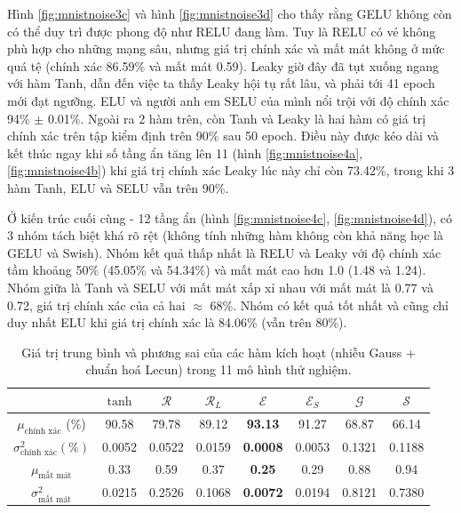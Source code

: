 Hình \ref{fig:mnistnoise3c} và hình \ref{fig:mnistnoise3d} cho thấy rằng GELU không còn có thể duy trì được phong độ như RELU đang làm.
Tuy là RELU có vẻ không phù hợp cho những mạng sâu, nhưng giá trị chính xác và mất mát không ở mức quá tệ (chính xác 86.59\% và mất mát 0.59).
Leaky giờ đây đã tụt xuống ngang với hàm Tanh, dẫn đến việc ta thấy Leaky hội tụ rất lâu, và phải tới 41 epoch mới đạt ngưỡng.
ELU và người anh em SELU của mình nổi trội với độ chính xác 94\% $\pm$ 0.01\%.
Ngoài ra 2 hàm trên, còn Tanh và Leaky là hai hàm có giá trị chính xác trên tập kiểm định trên 90\% sau 50 epoch.
Điều này được kéo dài và kết thúc ngay khi số tầng ẩn tăng lên 11 (hình \ref{fig:mnistnoise4a}, \ref{fig:mnistnoise4b}) khi giá trị chính xác Leaky lúc này chỉ còn 73.42\%, trong khi 3 hàm Tanh, ELU và SELU vẫn trên 90\%.
\vspace{5pt}

Ở kiến trúc cuối cùng - 12 tầng ẩn (hình \ref{fig:mnistnoise4c}, \ref{fig:mnistnoise4d}), có 3 nhóm tách biệt khá rõ rệt (không tính những hàm không còn khả năng học là GELU và Swish).
Nhóm kết quả thấp nhất là RELU và Leaky với độ chính xác tầm khoảng 50\% (45.05\% và 54.34\%) và mất mát cao hơn 1.0 (1.48 và 1.24).
Nhóm giữa là Tanh và SELU với mất mát xấp xỉ nhau với mất mát là 0.77 và 0.72, giá trị chính xác của cả hai $\approx$ 68\%.
Nhóm có kết quả tốt nhất và cũng chỉ duy nhất ELU khi giá trị chính xác là 84.06\% (vẫn trên 80\%).

\begin{table}[ht!]
\centering
\def\arraystretch{1.5}
\begin{tabular}{c|c|c|c|c|c|c|c|}
\cline{2-8}
                        & $\tanh$      & $\mathcal{R}$      & $\mathcal{R}_L$      & $\mathcal{E}$      & $\mathcal{E}_S$      & $\mathcal{G}$      & $\mathcal{S}$      \\ \hline
\multicolumn{1}{|c|}{$\mu_{\text{chính xác}}$ (\%)} & 90.58  & 79.78  & 89.12  & \textbf{93.13}  & 91.27  & 68.87  & 66.14  \\ \hline
\multicolumn{1}{|c|}{$\sigma^2_{\text{chính xác}} (\%)$} & 0.0052 & 0.0522 & 0.0159 & \textbf{0.0008} & 0.0053 & 0.1321 & 0.1188 \\ \hline
\multicolumn{1}{|c|}{$\mu_{\text{mất mát}}$} & 0.33   & 0.59   & 0.37   & \textbf{0.25}   & 0.29   & 0.88   & 0.94   \\ \hline
\multicolumn{1}{|c|}{$\sigma^2_{\text{mất mát}}$} & 0.0215 & 0.2526 & 0.1068 & \textbf{0.0072} & 0.0194 & 0.8121 & 0.7380 \\ \hline
\end{tabular}
\caption{Giá trị trung bình và phương sai của các hàm kích hoạt (nhiễu Gauss + chuẩn hoá Lecun) trong 11 mô hình thử nghiệm.}
\label{tab:mnistnoisemean}
\end{table}

